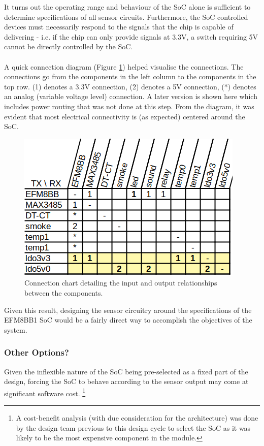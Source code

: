 \documentclass[12pt]{article}
\begin{document}
    It turns out the operating range and behaviour of the SoC alone is sufficient to determine specifications of all sensor circuits. Furthermore, the SoC controlled devices must necessarily respond to the signals that the chip is capable of delivering - i.e. if the chip can only provide signals at 3.3V, a switch requiring 5V cannot be directly controlled by the SoC.

    \paragraph{}
    A quick connection diagram (Figure \ref{fig:connect-diag}) helped visualise the connections. The connections go from the components in the left column to the components in the top row. (1) denotes a 3.3V connection, (2) denotes a 5V connection, (*) denotes an analog (variable voltage level) connection. A later version is shown here which includes power routing that was not done at this step. From the diagram, it was evident that most electrical connectivity is (as expected) centered around the SoC. 
  
    \begin{figure}[]
      \centering
      \caption{Connection chart detailing the input and output relationships between the components.}
      \label{fig:connect-diag}
      \includegraphics{connection-chart}
    \end{figure}
	
    Given this result, designing the sensor circuitry around the specifications of the EFM8BB1 SoC would be a fairly direct way to accomplish the objectives of the system.

    \subsubsection{Other Options?}
    Given the inflexible nature of the SoC being pre-selected as a fixed part of the design, forcing the SoC to behave according to the sensor output may come at significant software cost. \footnote{A cost-benefit analysis (with due consideration for the architecture) was done by the design team previous to this design cycle to select the SoC as it was likely to be the most expensive component in the module.}
\end{document}
